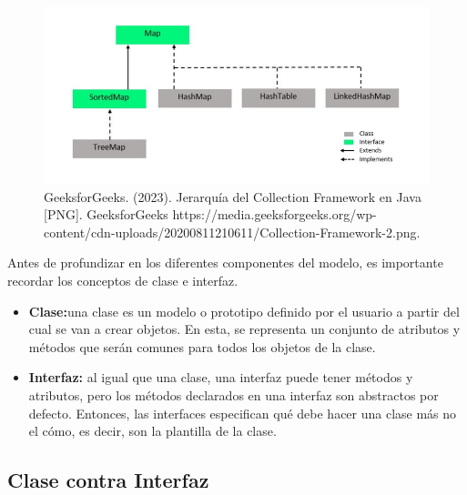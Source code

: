 \documentclass{report}
\begin{document}
\begin{figure}[h]
    \centering
    \includegraphics[width=0.75\linewidth]{Collection-Framework-2.png}
    \caption{GeeksforGeeks. (2023). Jerarquía del Collection Framework en Java [PNG]. GeeksforGeeks https://media.geeksforgeeks.org/wp-content/cdn-uploads/20200811210611/Collection-Framework-2.png. }
\end{figure}
\newpage
Antes de profundizar en los diferentes componentes del modelo, es importante recordar los conceptos de clase e interfaz.
\begin{itemize}
    \item \textbf{Clase:}una clase es un modelo o prototipo definido por el usuario a partir del cual se van a crear objetos. En esta, se representa un conjunto de atributos y métodos que serán comunes para todos los objetos de la clase.

    \item \textbf{Interfaz:} al igual que una clase, una interfaz puede tener métodos y atributos, pero los métodos declarados en una interfaz son abstractos por defecto. Entonces, las interfaces especifican qué debe hacer una clase más no el cómo, es decir, son la plantilla de la clase.
\end{itemize}
    \subsection*{Clase contra Interfaz}
    
\end{document}

